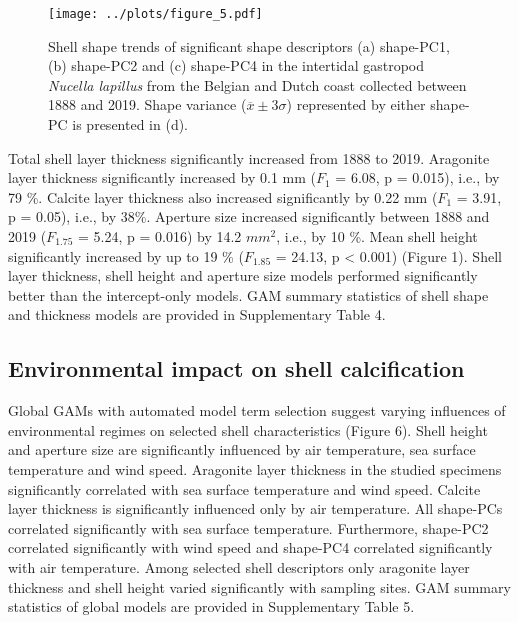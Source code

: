 \documentclass[smallextended]{svjour3}       %
\begin{document}
\begin{figure}
\centering
\texttt{[image: ../plots/figure\_5.pdf]}
\caption{Shell shape trends of significant shape descriptors (a)
shape-PC1, (b) shape-PC2 and (c) shape-PC4 in the intertidal gastropod
\emph{Nucella lapillus} from the Belgian and Dutch coast collected
between 1888 and 2019. Shape variance (\(\overline{x} \pm 3\sigma\))
represented by either shape-PC is presented in (d).}
\end{figure}

Total shell layer thickness significantly increased from 1888 to 2019.
Aragonite layer thickness significantly increased by 0.1 mm (\(F_{1}\) =
6.08, p = 0.015), i.e., by 79 \%. Calcite layer thickness also increased
significantly by 0.22 mm (\(F_{1}\) = 3.91, p = 0.05), i.e., by 38\%.
Aperture size increased significantly between 1888 and 2019
(\(F_{1.75}\) = 5.24, p = 0.016) by 14.2 \(mm^2\), i.e., by 10 \%. Mean
shell height significantly increased by up to 19 \% (\(F_{1.85}\) =
24.13, p \textless{} 0.001) (Figure 1). Shell layer thickness, shell
height and aperture size models performed significantly better than the
intercept-only models. GAM summary statistics of shell shape and
thickness models are provided in Supplementary Table 4.

\hypertarget{environmental-impact-on-shell-calcification}{%
\subsection{Environmental impact on shell
calcification}\label{environmental-impact-on-shell-calcification}}

Global GAMs with automated model term selection suggest varying
influences of environmental regimes on selected shell characteristics
(Figure 6). Shell height and aperture size are significantly influenced
by air temperature, sea surface temperature and wind speed. Aragonite
layer thickness in the studied specimens significantly correlated with
sea surface temperature and wind speed. Calcite layer thickness is
significantly influenced only by air temperature. All shape-PCs
correlated significantly with sea surface temperature. Furthermore,
shape-PC2 correlated significantly with wind speed and shape-PC4
correlated significantly with air temperature. Among selected shell
descriptors only aragonite layer thickness and shell height varied
significantly with sampling sites. GAM summary statistics of global
models are provided in Supplementary Table 5.
\end{document}
